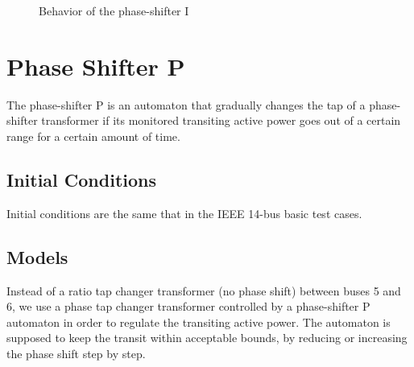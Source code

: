 \documentclass[a4paper, 12pt]{report}
\begin{document}
\begin{figure}[H]
\caption{Behavior of the phase-shifter I}
\end{figure}


\newpage
\section{Phase Shifter P}
\label{PhaseShifterPAutomaton}

The phase-shifter P is an automaton that gradually changes the tap of a phase-shifter transformer if its monitored transiting active power goes out of a certain range for a certain amount of time.

\subsection{Initial Conditions}

Initial conditions are the same that in the IEEE 14-bus basic test cases.

\subsection{Models}

Instead of a ratio tap changer transformer (no phase shift) between buses 5 and 6, we use a phase tap changer transformer controlled by a phase-shifter P automaton in order to regulate the transiting active power.
The automaton is supposed to keep the transit within acceptable bounds, by reducing or increasing the phase shift step by step. \\
\end{document}
